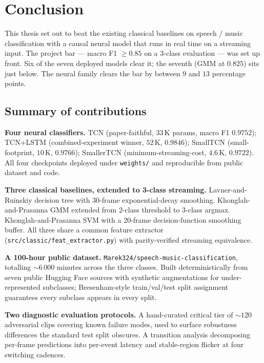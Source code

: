 \chapter{Conclusion}
\label{cap:conclusion}

This thesis set out to beat the existing classical baselines on speech / music classification with a causal neural model that runs in real time on a streaming input.
The project bar — macro F1 $\geq 0.85$ on a 3-class evaluation — was set up front.
Six of the seven deployed models clear it; the seventh (GMM at $0.825$) sits just below.
The neural family clears the bar by between $9$ and $13$ percentage points.

\section{Summary of contributions}
\label{sec:conclusion_contributions}

\textbf{Four neural classifiers.}
TCN (paper-faithful, $33$\,K params, macro F1 $0.9752$); TCN+LSTM (combined-experiment winner, $52$\,K, $0.9846$); SmallTCN (small-footprint, $10$\,K, $0.9766$); SmallerTCN (minimum-streaming-cost, $4.6$\,K, $0.9722$).
All four checkpoints deployed under \texttt{weights/} and reproducible from public dataset and code.

\textbf{Three classical baselines, extended to 3-class streaming.}
Lavner-and-Ruinskiy decision tree with 30-frame exponential-decay smoothing.
Khonglah-and-Prasanna GMM extended from 2-class threshold to 3-class argmax.
Khonglah-and-Prasanna SVM with a 20-frame decision-function smoothing buffer.
All three share a common feature extractor (\texttt{src/classic/feat\_extractor.py}) with parity-verified streaming equivalence.

\textbf{A 100-hour public dataset.}
\texttt{Marek324/speech-music-classification}, totalling $\sim 6\,000$ minutes across the three classes.
Built deterministically from seven public Hugging Face sources with synthetic augmentations for under-represented subclasses; Bresenham-style train/val/test split assignment guarantees every subclass appears in every split.

\textbf{Two diagnostic evaluation protocols.}
A hand-curated critical tier of $\sim 120$ adversarial clips covering known failure modes, used to surface robustness differences the standard test split obscures.
A transition analysis decomposing per-frame predictions into per-event latency and stable-region flicker at four switching cadences.

